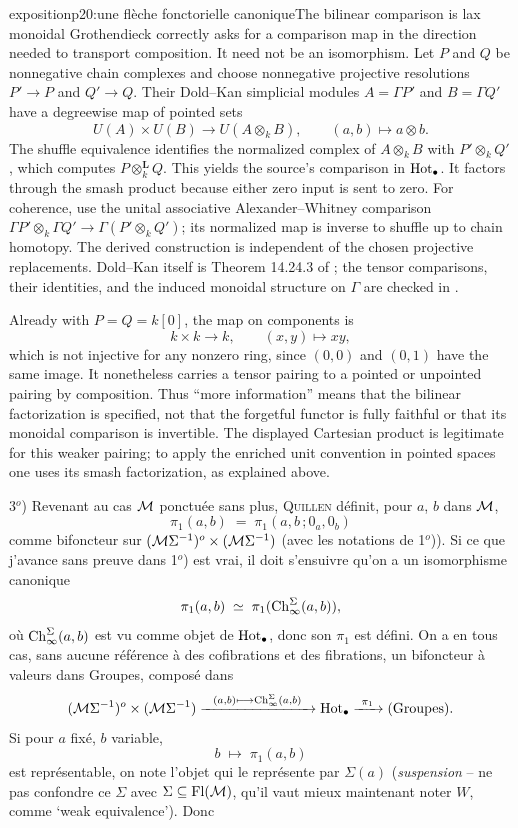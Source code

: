 \begin{dcomment}{exposition}{p20:une flèche fonctorielle canonique}{The bilinear comparison is lax monoidal}
Grothendieck correctly asks for a comparison map in the direction needed to transport composition. It need not be an isomorphism. Let $P$ and $Q$ be nonnegative chain complexes and choose nonnegative projective resolutions $P'\to P$ and $Q'\to Q$. Their Dold--Kan simplicial modules $A=\Gamma P'$ and $B=\Gamma Q'$ have a degreewise map of pointed sets
\[
 U(A)\times U(B)\longrightarrow U(A\otimes_k B),
 \qquad (a,b)\longmapsto a\otimes b.
\]
The shuffle equivalence identifies the normalized complex of $A\otimes_k B$ with $P'\otimes_k Q'$, which computes $P\otimes_k^{\mathbf L}Q$. This yields the source's comparison in $\mathrm{Hot}_\bullet$. It factors through the smash product because either zero input is sent to zero. For coherence, use the unital associative Alexander--Whitney comparison $\Gamma P'\otimes_k\Gamma Q'\to\Gamma(P'\otimes_k Q')$; its normalized map is inverse to shuffle up to chain homotopy. The derived construction is independent of the chosen projective replacements. Dold--Kan itself is Theorem 14.24.3 of \citet{StacksDoldKan}; the tensor comparisons, their identities, and the induced monoidal structure on $\Gamma$ are checked in \citet[\S2.3, especially equation (2.8)]{SchwedeShipley2003}.

Already with $P=Q=k[0]$, the map on components is
\[
 k\times k\longrightarrow k,\qquad (x,y)\longmapsto xy,
\]
which is not injective for any nonzero ring, since $(0,0)$ and $(0,1)$ have the same image. It nonetheless carries a tensor pairing to a pointed or unpointed pairing by composition. Thus ``more information'' means that the bilinear factorization is specified, not that the forgetful functor is fully faithful or that its monoidal comparison is invertible. The displayed Cartesian product is legitimate for this weaker pairing; to apply the enriched unit convention in pointed spaces one uses its smash factorization, as explained above.
\end{dcomment}


3$^o$) Revenant au cas $\mathcal{M}$ ponctuée sans plus, \textsc{Quillen} définit, pour $a$, $b$ dans $\mathcal{M}$,
\[
\pi_1(a,b) \;=\; \pi_1(a,b\,;0_a,0_b)
\]
comme bifoncteur sur $(\mathcal{M}\Sigma^{-1})^o\times(\mathcal{M}\Sigma^{-1})$ (avec les notations de 1$^o$)). Si ce que j'avance sans preuve dans 1$^o$) est vrai, il doit s'ensuivre qu'on a un isomorphisme canonique
\[
\pi_1(a,b) \;\simeq\; \pi_1(\mathrm{Ch}^{\Sigma}_{\infty}(a,b)),
\]
où $\mathrm{Ch}^{\Sigma}_{\infty}(a,b)$ est vu comme objet de $\mathrm{Hot}_{\bullet}$, donc son $\pi_1$ est défini. On a en tous cas, sans aucune référence à des cofibrations et des fibrations, un bifoncteur à valeurs dans Groupes, composé dans
\[
(\mathcal{M}\Sigma^{-1})^o\times(\mathcal{M}\Sigma^{-1}) \xrightarrow{\ \ (a,b)\longmapsto \mathrm{Ch}^{\Sigma}_{\infty}(a,b)\ \ } \mathrm{Hot}_{\bullet} \xrightarrow{\ \pi_1\ } (\text{Groupes}).
\]
Si pour $a$ fixé, $b$ variable,
\[
b \;\longmapsto\; \pi_1(a,b)
\]
est représentable, on note l'objet qui le représente par $\Sigma(a)$ (\textit{suspension} -- ne pas confondre ce $\Sigma$ avec $\Sigma \subseteq \mathrm{Fl}(\mathcal{M})$, qu'il vaut mieux maintenant noter $W$, comme `weak equivalence'). Donc

